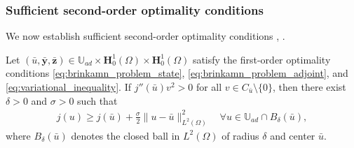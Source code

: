 \documentclass[final]{siamart0216}
\begin{document}
\subsubsection{Sufficient second-order optimality conditions}

We now establish sufficient second-order optimality conditions \cite[Theorem 2.3]{MR2902693}, \cite[Theorem 23]{MR3586845}.

\begin{theorem}\label{theorem_second_order_optimal}
Let $(\bar{u},\bar{\mathbf{y}},\bar{\mathbf{z}}) \in \mathbb{U}_{ad} \times \mathbf{H}_0^1(\Omega) \times \mathbf{H}_0^1(\Omega)$ satisfy the first-order optimality conditions \eqref{eq:brinkamn_problem_state}, \eqref{eq:brinkamn_problem_adjoint}, and \eqref{eq:variational_inequality}. If $j''(\bar{u})v^2> 0$ for all $v\in C_{\bar{u}}\setminus\{0\}$, then there exist $\delta>0$ and $\sigma>0$ such that
\begin{eqnarray}\label{eq:second_order_condition}
j(u)\geq j(\bar{u})+\frac{\sigma}{2}\|u-\bar{u}\|_{L^2(\Omega)}^2\quad\forall u\in\mathbb{U}_{ad}\cap B_{\delta}(\bar{u}),
\end{eqnarray}
where $B_{\delta}(\bar{u})$ denotes the closed ball in $L^2(\Omega)$ of radius $\delta$ and center $\bar{u}$.
\end{theorem}
\end{document}
